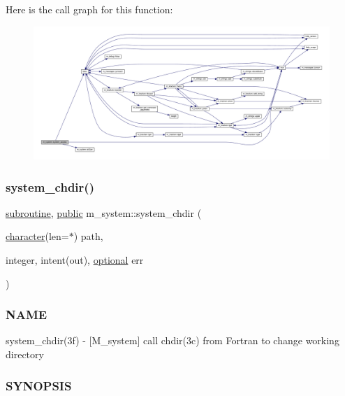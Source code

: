Here is the call graph for this function\+:
\nopagebreak
\begin{figure}[H]
\begin{center}
\leavevmode
\includegraphics[width=350pt]{namespacem__system_a4687a363acbb7084a51bc77844789275_cgraph}
\end{center}
\end{figure}
\mbox{\label{namespacem__system_a47746b670cb21bae0957c9bb2bccf209}} 
\subsubsection{\texorpdfstring{system\+\_\+chdir()}{system\_chdir()}}
{\footnotesize\ttfamily \hyperlink{M__stopwatch_83_8txt_acfbcff50169d691ff02d4a123ed70482}{subroutine}, \hyperlink{M__stopwatch_83_8txt_a2f74811300c361e53b430611a7d1769f}{public} m\+\_\+system\+::system\+\_\+chdir (\begin{DoxyParamCaption}\item[{\hyperlink{option__stopwatch_83_8txt_abd4b21fbbd175834027b5224bfe97e66}{character}(len=$\ast$)}]{path,  }\item[{integer, intent(out), \hyperlink{option__stopwatch_83_8txt_aa4ece75e7acf58a4843f70fe18c3ade5}{optional}}]{err }\end{DoxyParamCaption})}



\subsubsection*{N\+A\+ME}

system\+\_\+chdir(3f) -\/ \mbox{[}M\+\_\+system\mbox{]} call chdir(3c) from Fortran to change working directory \subsubsection*{S\+Y\+N\+O\+P\+S\+IS}

